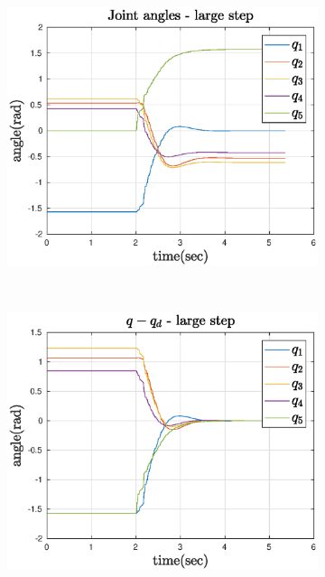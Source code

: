 \def\picsSiz{1.08}
\begin{figure}[htbp]
    \centering
    \begin{subfigure}[htbp]{0.45\textwidth}
        \centering
        \includegraphics[width = \picsSiz\linewidth]{img/LSq.eps}
        \caption{ }
        \label{fig:LSq}
    \end{subfigure}
    ~ 
    \begin{subfigure}[htbp]{0.45\textwidth}
        \centering
        \includegraphics[width = \picsSiz\linewidth]{img/LSerror.eps}
        \caption{ }

\end{subfigure}
\end{figure}
